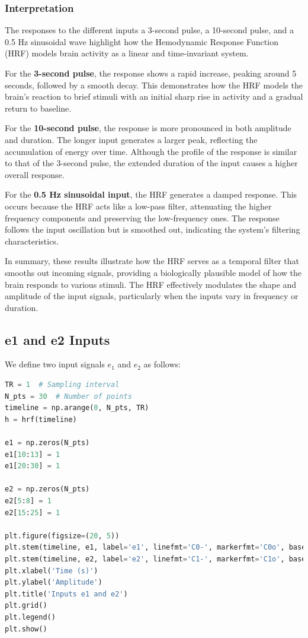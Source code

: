 \documentclass[10pt]{article}
\theoremstyle{definition}
\theoremstyle{remark}
\theoremstyle{definition}
\numberwithin{equation}{prob}
\begin{document}
\subsubsection{Interpretation}

The responses to the different inputs a 3-second pulse, a 10-second pulse, and a 0.5 Hz sinusoidal wave highlight how the Hemodynamic Response Function (HRF) models brain activity as a linear and time-invariant system.

For the \textbf{3-second pulse}, the response shows a rapid increase, peaking around 5 seconds, followed by a smooth decay. This demonstrates how the HRF models the brain's reaction to brief stimuli with an initial sharp rise in activity and a gradual return to baseline.

For the \textbf{10-second pulse}, the response is more pronounced in both amplitude and duration. The longer input generates a larger peak, reflecting the accumulation of energy over time. Although the profile of the response is similar to that of the 3-second pulse, the extended duration of the input causes a higher overall response.

For the \textbf{0.5 Hz sinusoidal input}, the HRF generates a damped response. This occurs because the HRF acts like a low-pass filter, attenuating the higher frequency components and preserving the low-frequency ones. The response follows the input oscillation but is smoothed out, indicating the system's filtering characteristics.

In summary, these results illustrate how the HRF serves as a temporal filter that smooths out incoming signals, providing a biologically plausible model of how the brain responds to various stimuli. The HRF effectively modulates the shape and amplitude of the input signals, particularly when the inputs vary in frequency or duration.

\subsection{e1 and e2 Inputs}

We define two input signals $e_1$ and $e_2$ as follows:

\begin{lstlisting}[language=Python]
TR = 1  # Sampling interval
N_pts = 30  # Number of points
timeline = np.arange(0, N_pts, TR)
h = hrf(timeline)

e1 = np.zeros(N_pts)
e1[10:13] = 1
e1[20:30] = 1

e2 = np.zeros(N_pts)
e2[5:8] = 1
e2[15:25] = 1

plt.figure(figsize=(20, 5))
plt.stem(timeline, e1, label='e1', linefmt='C0-', markerfmt='C0o', basefmt='C0-')
plt.stem(timeline, e2, label='e2', linefmt='C1-', markerfmt='C1o', basefmt='C1-')
plt.xlabel('Time (s)')
plt.ylabel('Amplitude')
plt.title('Inputs e1 and e2')
plt.grid()
plt.legend()
plt.show()

\end{lstlisting}
\end{document}
